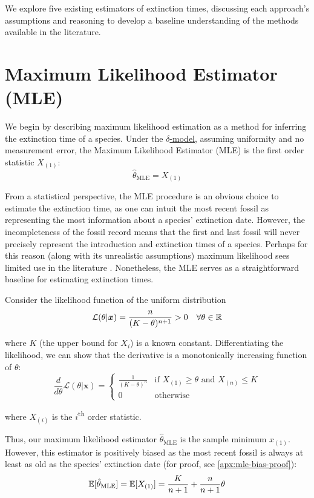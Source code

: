 
We explore five existing estimators of extinction times, discussing each approach's assumptions and reasoning to develop a baseline understanding of the methods available in the literature.

\section{Maximum Likelihood Estimator (MLE)}\label{section:MLE}
We begin by describing maximum likelihood estimation as a method for inferring the extinction time of a species. Under the \hyperref[model: no-measurement-error]{$\delta$-model}, assuming uniformity and no measurement error, the Maximum Likelihood Estimator (MLE) is the first order statistic $X_{(1)}$:
\begin{equation}\label{eq:mle}
    \hat\theta_{\text{MLE}} = X_{(1)}
\end{equation}

From a statistical perspective, the MLE procedure is an obvious choice to estimate the extinction time, as one can intuit the most recent fossil as representing the most information about a species' extinction date. However, the incompleteness of the fossil record means that the first and last fossil will never precisely represent the introduction and extinction times of a species. Perhaps for this reason (along with its unrealistic assumptions) maximum likelihood sees limited use in the literature \cite{Ludwig1996, Jaric2016}. Nonetheless, the MLE serves as a straightforward baseline for estimating extinction times.

Consider the likelihood function of the uniform distribution
\[
\mathcal{L}(\theta | \bm{x}) =  \frac{n}{(K - \theta)^{n+1}} > 0 \quad \forall \theta \in \mathbb{R}
\]

where $K$ (the upper bound for $X_i$) is a known constant. Differentiating the likelihood, we can show that the derivative is a monotonically increasing function of $\theta$:
\[
\frac{d}{d\theta}\mathcal{L}(\theta | \bm{x} ) = \begin{cases}
    \frac{1}{(K-\theta)^n} & \text{if $X_{(1)} \geq \theta$ and $X_{(n)} \leq K$} \\
    0 & \text{otherwise}
\end{cases}
\]

where $X_{(i)}$ is the $i$\textsuperscript{th} order statistic.

Thus, our maximum likelihood estimator $\hat\theta_{\text{MLE}}$ is the sample minimum $x_{(1)}$. However, this estimator is positively biased as the most recent fossil is always at least as old as the species' extinction date (for proof, see \autoref{apx:mle-bias-proof}):
\[
    \mathbb{E}[\hat\theta_{\text{MLE}}] = \mathbb{E}[X_{(1)}] = \frac{K}{n+1} + \frac{n}{n+1}\theta
\]

